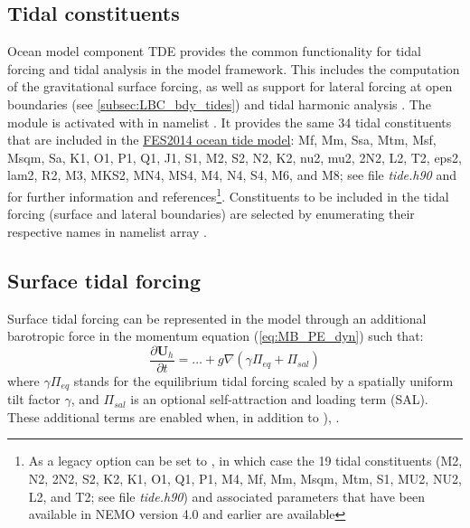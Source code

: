 \documentclass[../main/NEMO_manual]{subfiles}
\begin{document}
\subsection{Tidal constituents}
Ocean model component TDE provides the common functionality for tidal forcing
and tidal analysis in the model framework. This includes the computation of the gravitational
surface forcing, as well as support for lateral forcing at open boundaries (see
\autoref{subsec:LBC_bdy_tides}) and tidal harmonic analysis \iffalse (see
\autoref{subsec:DIA_diamlr?} and \autoref{subsec:DIA_diadetide?}) \fi . The module is
activated with  in namelist
. It provides the same 34 tidal constituents that are
included in the
\href{https://www.aviso.altimetry.fr/en/data/products/auxiliary-products/global-tide-fes.html}{FES2014
  ocean tide model}: Mf, Mm, Ssa, Mtm, Msf, Msqm, Sa, K1, O1, P1, Q1, J1, S1,
M2, S2, N2, K2, nu2, mu2, 2N2, L2, T2, eps2, lam2, R2, M3, MKS2, MN4, MS4, M4,
N4, S4, M6, and M8; see file \textit{tide.h90} and  for further
information and references\footnote{As a legacy option  can be
  set to , in which case the 19 tidal constituents (M2, N2, 2N2, S2,
  K2, K1, O1, Q1, P1, M4, Mf, Mm, Msqm, Mtm, S1, MU2, NU2, L2, and T2; see file
  \textit{tide.h90}) and associated parameters that have been available in NEMO version
  4.0 and earlier are available}. Constituents to be included in the tidal forcing
(surface and lateral boundaries) are selected by enumerating their respective
names in namelist array .\par

\subsection{Surface tidal forcing}
Surface tidal forcing can be represented in the model through an additional
barotropic force in the momentum equation (\autoref{eq:MB_PE_dyn}) such that:
\[
  \frac{\partial {\mathrm {\mathbf U}}_h }{\partial t} = \ldots +g\nabla (\gamma
  \Pi_{eq} + \Pi_{sal})
\]
where $\gamma \Pi_{eq}$ stands for the equilibrium tidal forcing scaled by a spatially
uniform tilt factor $\gamma$, and $\Pi_{sal}$ is an optional
self-attraction and loading term (SAL). These additional terms are enabled when,
in addition to ),
.\par
\end{document}
